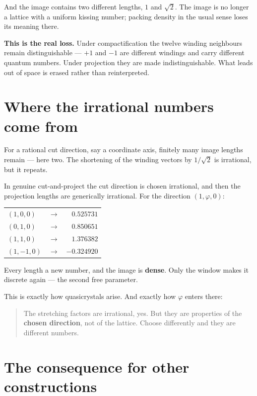 And the image contains two different lengths, $1$ and $\sqrt2$. The
image is no longer a lattice with a uniform kissing number; packing
density in the usual sense loses its meaning there.

\textbf{This is the real loss.} Under compactification the twelve
winding neighbours remain distinguishable --- $+1$ and $-1$ are
different windings and carry different quantum numbers. Under
projection they are made indistinguishable. What leads out of space is
erased rather than reinterpreted.

\section{Where the irrational numbers come from}

For a rational cut direction, say a coordinate axis, finitely many
image lengths remain --- here two. The shortening of the winding
vectors by $1/\sqrt2$ is irrational, but it repeats.

In genuine cut-and-project the cut direction is chosen irrational, and
then the projection lengths are generically irrational. For the
direction $(1, \varphi, 0)$:
\begin{center}
\begin{tabular}{lcr}
$(1, 0, 0)$ & $\longrightarrow$ & $0.525731$ \\
$(0, 1, 0)$ & $\longrightarrow$ & $0.850651$ \\
$(1, 1, 0)$ & $\longrightarrow$ & $1.376382$ \\
$(1,-1, 0)$ & $\longrightarrow$ & $-0.324920$ \\
\end{tabular}
\end{center}

Every length a new number, and the image is \textbf{dense}. Only the
window makes it discrete again --- the second free parameter.

This is exactly how quasicrystals arise. And exactly how $\varphi$
enters there:

\begin{quote}
The stretching factors are irrational, yes. But they are properties of
the \textbf{chosen direction}, not of the lattice. Choose differently
and they are different numbers.
\end{quote}

\section{The consequence for other constructions}

